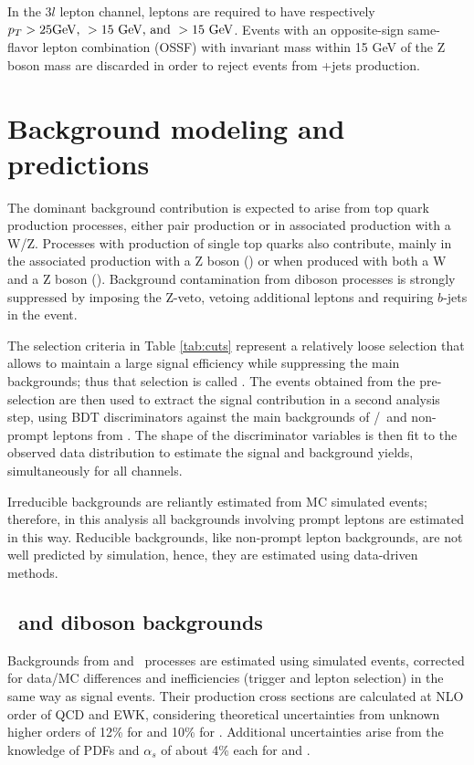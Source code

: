 In the $3l$ lepton channel, leptons are required to have respectively $p_T > 25 \textrm{GeV, }> 15\textrm{ GeV, and }> 15\textrm{ GeV}$. Events with an opposite-sign same-flavor lepton combination (OSSF) with invariant mass within 15 GeV of the Z boson mass are discarded in order to reject events from \WZ +jets production.

\section{Background modeling and predictions}\label{sec:bg}

The dominant background contribution is expected to arise from top quark production processes, either \ttbar pair production or in \ttbar associated production with a W/Z. Processes with production of single top quarks also contribute, mainly in the associated production with a Z boson (\tZq) or when produced with both a W and a Z boson (\tZW). Background contamination from diboson processes is strongly suppressed by imposing the Z-veto, vetoing additional leptons and requiring $b$-jets in the event.

The selection criteria in Table \ref{tab:cuts} represent a relatively loose selection that allows to maintain a large signal efficiency while suppressing the main backgrounds; thus that selection is called . The events obtained from the pre-selection are then used to extract the signal contribution in a second analysis step, using BDT discriminators against the main backgrounds of \ttW/\ttZ\ and non-prompt leptons from \ttbar. The shape of the discriminator variables is then fit to the observed data distribution to estimate the signal and background yields, simultaneously for all channels.

Irreducible backgrounds are reliantly estimated from MC simulated events; therefore, in this analysis all backgrounds involving prompt leptons are estimated in this way. Reducible backgrounds, like non-prompt lepton backgrounds, are not well predicted by simulation, hence, they are estimated using data-driven methods.

\subsection{\ttV\ and diboson backgrounds}

Backgrounds from \ttW and \ttZ\ processes are estimated using simulated events, corrected for data/MC differences and inefficiencies (trigger and lepton selection) in the same way as signal events. Their production cross sections are calculated at NLO order of QCD and EWK, considering theoretical uncertainties from unknown higher orders of 12\% for \ttW and 10\% for \ttZ. Additional uncertainties arise from the knowledge of PDFs and $\alpha_s$ of about 4\% each for \ttW and \ttZ.

